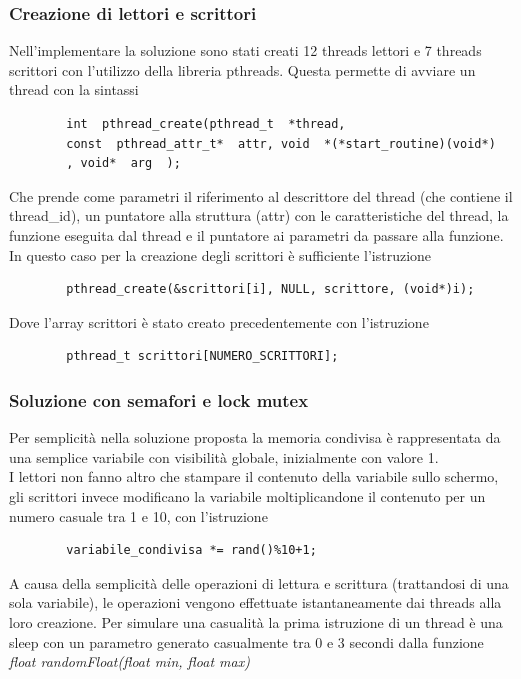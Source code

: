 \documentclass[10pt]{beamer}
\begin{document}
\begin{frame}[fragile]
	\frametitle{Creazione di lettori e scrittori}
	Nell'implementare la soluzione sono stati creati 12 threads lettori e 7 threads scrittori con l'utilizzo della libreria pthreads. Questa permette di avviare un thread con la sintassi
	\begin{verbatim}
		int  pthread_create(pthread_t  *thread,
		const  pthread_attr_t*  attr, void  *(*start_routine)(void*)
		, void*  arg  );
	\end{verbatim}
	Che prende come parametri il riferimento al descrittore del thread (che contiene il thread\_id), un puntatore alla struttura (attr) con le caratteristiche del thread, la funzione eseguita dal thread e il puntatore ai parametri da passare alla funzione.
	\\In questo caso per la creazione degli scrittori è sufficiente l'istruzione 
	\begin{verbatim}
		pthread_create(&scrittori[i], NULL, scrittore, (void*)i);
	\end{verbatim}
	Dove l'array scrittori è stato creato precedentemente con l'istruzione
	\begin{verbatim}
		pthread_t scrittori[NUMERO_SCRITTORI];
	\end{verbatim}
\end{frame}

\begin{frame}[fragile]
	\frametitle{Soluzione con semafori e lock mutex}
	Per semplicità nella soluzione proposta la memoria condivisa è rappresentata da una semplice variabile con visibilità globale, inizialmente con valore 1.
	\\I lettori non fanno altro che stampare il contenuto della variabile sullo schermo, gli scrittori invece modificano la variabile moltiplicandone il contenuto per un numero casuale tra 1 e 10, con l'istruzione
	\begin{verbatim}
		variabile_condivisa *= rand()%10+1;
	\end{verbatim}
	A causa della semplicità delle operazioni di lettura e scrittura (trattandosi di una sola variabile), le operazioni vengono effettuate istantaneamente dai threads alla loro creazione. Per simulare una casualità la prima istruzione di un thread è una sleep con un parametro generato casualmente tra 0 e 3 secondi dalla funzione \emph{float randomFloat(float min, float max)}
\end{frame}
\end{document}
